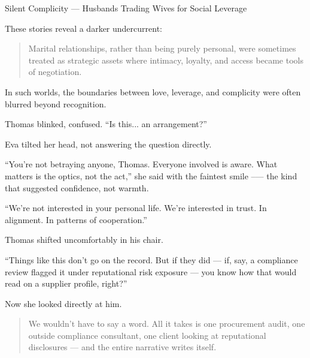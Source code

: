 \begin{HistoricalSidebar}{Silent Complicity --- Husbands Trading Wives for Social Leverage}
    \medskip
    
    These stories reveal a darker undercurrent:

    \medskip
    
    \begin{quote}
        Marital relationships, rather than being purely personal, were sometimes treated as strategic assets  
        where intimacy, loyalty, and access became tools of negotiation.
    \end{quote}
    
    In such worlds, the boundaries between love, leverage, and complicity were often blurred beyond recognition.
    
\end{HistoricalSidebar}

\medskip

Thomas blinked, confused.  ``Is this... an arrangement?''

Eva tilted her head, not answering the question directly.

``You’re not betraying anyone, Thomas. Everyone involved is aware. What matters is the optics, not the act,'' she said with the faintest smile --— the kind that suggested confidence, not warmth.

``We’re not interested in your personal life. We’re interested in trust. In alignment. In patterns of cooperation.''

Thomas shifted uncomfortably in his chair.

``Things like this don’t go on the record. But if they did — if, say, a compliance review flagged it under reputational risk exposure — you know how that would read on a supplier profile, right?''

Now she looked directly at him.

\begin{quote}
We wouldn’t have to say a word. All it takes is one procurement audit, one outside compliance consultant, one client looking at reputational disclosures — and the entire narrative writes itself.
\end{quote}

\medskip

